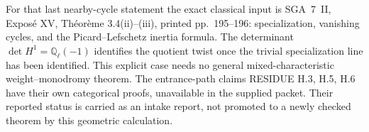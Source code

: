 For that last nearby-cycle statement the exact classical input is
SGA~7~II, Expos\'e XV, Th\'eor\`eme 3.4(ii)--(iii), printed
pp.~195--196: specialization, vanishing cycles, and the
Picard--Lefschetz inertia formula. The determinant
$\det H^1=\mathbb Q_\ell(-1)$ identifies the quotient twist once
the trivial specialization line has been identified. This explicit
case needs no general mixed-characteristic weight--monodromy theorem.
The entrance-path claims RESIDUE H.3, H.5, H.6 have their own
categorical proofs, unavailable in the supplied packet. Their
reported status is carried as an intake report, not promoted to a
newly checked theorem by this geometric calculation.
